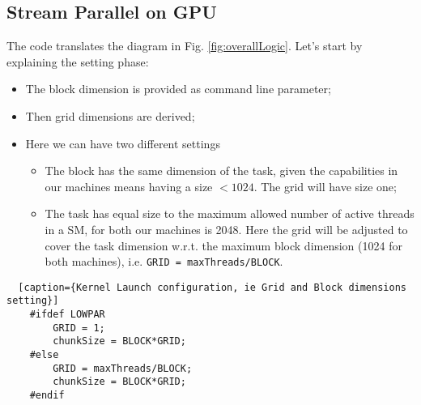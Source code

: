 \subsection{Stream Parallel on GPU}
	The code translates the diagram in Fig. \ref{fig:overallLogic}.
	Let's start by explaining the setting phase:
	\begin{itemize}
		\item The block dimension is provided as command line parameter;
		\item Then grid dimensions are derived;
		\item Here we can have two different settings
		\begin{itemize}
			\item The block has the same dimension of the task, given the capabilities in our machines means having a size \(< 1024\). The grid will have size one;
			\item The task has equal size to the maximum allowed number of active threads in a SM, for both our machines is 2048. Here the grid will be adjusted to cover the task dimension w.r.t. the maximum block dimension (1024 for both machines), i.e. \texttt{GRID = maxThreads/BLOCK}.
		\end{itemize}
	
	\end{itemize}
	\begin{lstlisting}	[caption={Kernel Launch configuration, ie Grid and Block dimensions setting}]	
	#ifdef LOWPAR
		GRID = 1;
		chunkSize = BLOCK*GRID;		
	#else
		GRID = maxThreads/BLOCK;  
		chunkSize = BLOCK*GRID;		
	#endif		
	\end{lstlisting}
	
